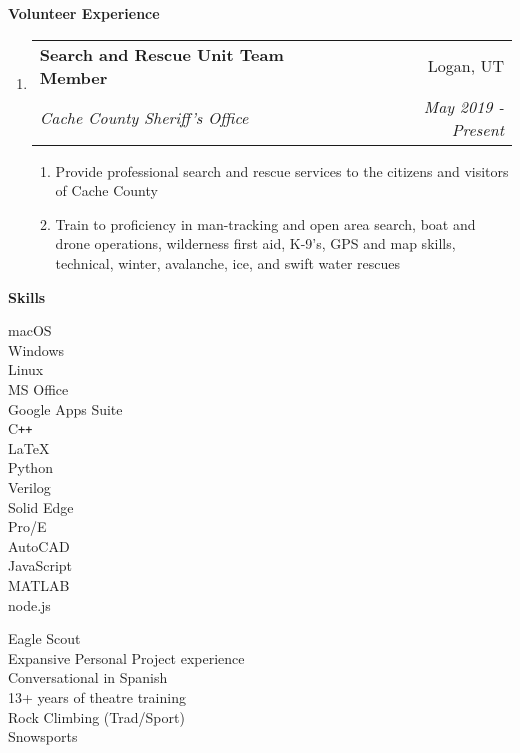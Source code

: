 \documentclass[letterpaper,10pt]{extarticle}
\makeatletter
\newcommand\tab[1][.25cm]{\hspace*{#1}} %
\newcommand{\resheading}[1]{{\large \colorbox{mygrey}{\begin{minipage}{\textwidth}{\textbf{#1 \vphantom{p\^{E}}}}\end{minipage}}}}
\newcommand{\ressubheading}[4]{
\begin{tabular*}{7.5in}{l@{\extracolsep{\fill}}r}
		\tab\textbf{#1} & #2 \\
		\tab\textit{#3} & \textit{#4} \\
\end{tabular*}\vspace{-6pt}}
\newcommand{\resitem}[1]{\item #1 \vspace{-2pt}}
\makeatother
\begin{document}
\begin{enumerate}
\begin{comment}


	

\item[]
	\ressubheading{Mechanic/Automotive Technician}{Naperville, IL}{Naperville Auto Care \& Emissions}{Sep 2011 - Dec 2012}
	\begin{enumerate}
		\resitem[--]{Diagnosed, repaired, and maintained automobiles, motorcycles, and trucks}
	\end{enumerate}
	\end{comment}
\end{enumerate}

\resheading{Volunteer Experience}
\vspace{-0.4cm}
\begin{enumerate}
\setlength\itemsep{-.5em}

\item[]
	\ressubheading{Search and Rescue Unit Team Member}{Logan, UT}{Cache County Sheriff's Office}{May 2019 - Present}
	\begin{enumerate}
		\setlength\itemsep{-.25em}
		\resitem[--]{Provide professional search and rescue services to the citizens and visitors of Cache County}
		\resitem[--]{Train to proficiency in man-tracking and open area search, boat and drone operations, wilderness first aid, K-9’s, GPS and map skills, technical, winter, avalanche, ice, and swift water rescues}
	\end{enumerate}
\end{enumerate}


\resheading{Skills}
\begin{description}
\vspace{-.2cm}
\item[Computer:] \hfill 
\begin{multicols}{5}
macOS \\ Windows  \\ Linux \\MS Office \\Google Apps Suite \\C{}\verb!++! \\ \LaTeX   \\Python \\ Verilog \\
Solid Edge\\ Pro/E\\ AutoCAD \\JavaScript \\MATLAB \\ node.js
\end{multicols}
\vspace{-.2cm}
\item[Miscellaneous:] \hfill 
\begin{multicols}{3}
Eagle Scout\\ Expansive Personal Project experience\\ Conversational in Spanish\\ 13+ years of theatre training\\ Rock Climbing (Trad/Sport) \\ Snowsports
\end{multicols}
\end{description}
\end{document}
